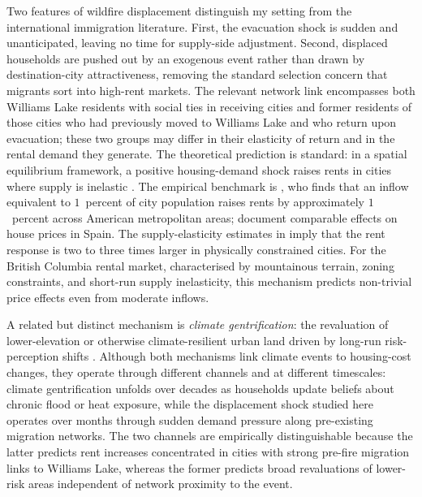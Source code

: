 \documentclass[12pt]{article}
\begin{document}
Two features of wildfire displacement distinguish my setting from the
international immigration literature. First, the evacuation shock is
sudden and unanticipated, leaving no time for supply-side adjustment.
Second, displaced households are pushed out by an exogenous event rather
than drawn by destination-city attractiveness, removing the standard
selection concern that migrants sort into high-rent markets. The
relevant network link encompasses both Williams Lake residents with social ties
in receiving cities and former residents of those cities who had previously
moved to Williams Lake and who return upon evacuation; these two groups may
differ in their elasticity of return and in the rental demand they generate. The
theoretical prediction is standard: in a spatial equilibrium framework,
a positive housing-demand shock raises rents in cities where supply is
inelastic \citep{saiz2010}. The empirical benchmark is \citet{saiz2007},
who finds that an inflow equivalent to $1$~percent of city population
raises rents by approximately $1$~percent across American metropolitan
areas; \citet{gonzalez2013} document comparable effects on house prices in Spain.
The supply-elasticity estimates in \citet{saiz2010} imply that the rent response is two to three times
larger in physically constrained cities. For the British Columbia rental
market, characterised by mountainous terrain, zoning constraints, and
short-run supply inelasticity, this mechanism predicts non-trivial price
effects even from moderate inflows.

A related but distinct mechanism is \emph{climate gentrification}: the
revaluation of lower-elevation or otherwise climate-resilient urban land
driven by long-run risk-perception shifts \citep{keenan2018, bernstein2019}.
Although both mechanisms link climate events to housing-cost changes, they
operate through different channels and at different timescales: climate
gentrification unfolds over decades as households update beliefs about
chronic flood or heat exposure, while the displacement shock studied here
operates over months through sudden demand pressure along pre-existing
migration networks. The two channels are empirically distinguishable
because the latter predicts rent increases concentrated in cities with
strong pre-fire migration links to Williams Lake, whereas the former
predicts broad revaluations of lower-risk areas independent of network
proximity to the event.

\fi  %
\end{document}
